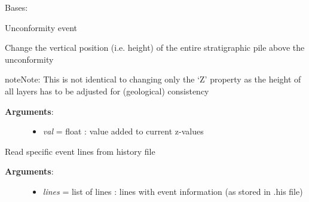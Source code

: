 \documentclass[a4paper,10pt,english]{sphinxmanual}
\begin{document}
\begin{fulllineitems}
\label{pynoddy:pynoddy.events.Unconformity}
Bases: {\hyperref[pynoddy:pynoddy.events.Event]{\emph{}}}

Unconformity event

\begin{fulllineitems}
\label{pynoddy:pynoddy.events.Unconformity.change_height}
Change the vertical position (i.e. height) of the entire stratigraphic pile
above the unconformity

\begin{notice}{note}{Note:}
This is not identical to changing only the `Z' property as
the height of all layers has to be adjusted for (geological)
consistency
\end{notice}
\begin{description}
\item[{\textbf{Arguments}:}] \leavevmode\begin{itemize}
\item {} 
\emph{val} = float : value added to current z-values

\end{itemize}

\end{description}

\end{fulllineitems}


\begin{fulllineitems}
\label{pynoddy:pynoddy.events.Unconformity.parse_event_lines}
Read specific event lines from history file
\begin{description}
\item[{\textbf{Arguments}:}] \leavevmode\begin{itemize}
\item {} 
\emph{lines} = list of lines : lines with event information (as stored in .his file)

\end{itemize}

\end{description}

\end{fulllineitems}


\end{fulllineitems}
\end{document}
